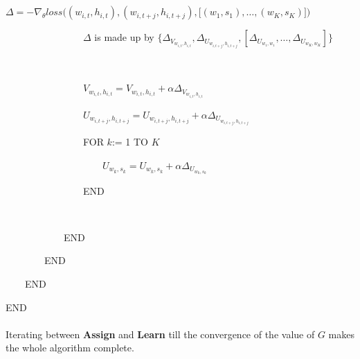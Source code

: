 \documentclass[12pt,a4paper,twoside]{book}
\begin{document}
\ \ \ \ \ \ \ \ \ \ \ \ \ \ \ \

\ \ \ \ \ \ \ \ \ \ \ \ \ \ \ \ $\Delta = -\nabla_\theta loss\bigg ( (w_{i,t},h_{i,t}),(w_{i,t+j},h_{i,t+j}),\big [(w_1,s_1),\ldots,(w_K,s_K)\big ]\bigg )$

\ \ \ \ \ \ \ \ \ \ \ \ \ \ \ \ $\Delta$ is made up by $ \{\Delta_{V_{w_{i,t},h_{i,t}}}, \Delta_{U_{w_{i,t+j},h_{i,t+j}}}, [\Delta_{U_{w_1,w_1}},\ldots,\Delta_{U_{w_K,w_K}}]\}$

\ \ \ \ \ \ \ \ \ \ \ \ \ \ \ \

\ \ \ \ \ \ \ \ \ \ \ \ \ \ \ \ $V_{w_{i,t},h_{i,t}} = V_{w_{i,t},h_{i,t}} + \alpha \Delta_{V_{w_{i,t},h_{i,t}}}$
 
\ \ \ \ \ \ \ \ \ \ \ \ \ \ \ \ $U_{w_{i,t+j},h_{i,t+j}} = U_{w_{i,t+j},h_{i,t+j}} + \alpha \Delta_{U_{w_{i,t+j},h_{i,t+j}}}$ 

\ \ \ \ \ \ \ \ \ \ \ \ \ \ \ \ FOR $k$:= 1 TO $K$

\ \ \ \ \ \ \ \ \ \ \ \ \ \ \ \ \ \ \ \ $U_{w_k,s_k} = U_{w_k,s_k} + \alpha \Delta_{U_{w_k,s_k}}$ 

\ \ \ \ \ \ \ \ \ \ \ \ \ \ \ \ END

\ \ \ \ \ \ \ \ \ \ \ \ \ \ \ \
 
\ \ \ \ \ \ \ \ \ \ \ \ END 

\ \ \ \ \ \ \ \  END

\ \ \ \ END

END

\paragraph{}
Iterating between \textbf{Assign} and \textbf{Learn} till the convergence of the value of $G$ makes the whole algorithm complete. 
\end{document}
